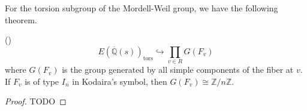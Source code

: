 \documentclass[main]{subfiles}
\begin{document}
For the torsion subgroup of the Mordell-Weil group, we have the following theorem.
\begin{thm}{(\cite[Lem.3.5]{ref:naskrecki2013})}
    \label{thm:torsion}
    \begin{equation*}
        E(\overline{\mathbb{Q}}(s))_{\text{tors}} \hookrightarrow \prod_{v \in R} G(F_{v})
    \end{equation*}
    where $G(F_{v})$ is the group generated by all simple components of the fiber at $v$.
    If $F_v$ is of type $I_n$ in Kodaira's symbol, then $G(F_{v}) \cong \mathbb{Z} / n \mathbb{Z}$.
\end{thm}
\begin{proof}
    TODO
\end{proof}
\end{document}
